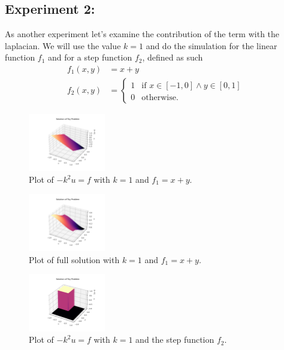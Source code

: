 \documentclass[acmtog]{acmart}
\begin{document}
\subsection{Experiment 2:}
As another experiment let's examine the contribution of the term with the
laplacian. We will use the value $k = 1$ and do the simulation for the linear
function $f_1$ and for a step function $f_2$, defined as such
%
\begin{align}
  f_1(x,y) & = x + y                                           \\
  f_2(x,y) & = \begin{cases}
                 1 & \text{if } x \in [-1, 0] \land y \in [0, 1] \\
                 0 & \text{otherwise}.
               \end{cases}
\end{align}
%
\begin{figure}[H]
  \centering
  \includegraphics[width=0.3\textwidth]{Images/exp1_plane_k.png}
  \caption{Plot of $-k^2 u = f$ with $k=1$ and $f_1 = x+y$.~\label{fig:exp1_plane_k}}
\end{figure}
\begin{figure}[H]
  \centering
  \includegraphics[width=0.3\textwidth]{Images/exp1_plane_full.png}
  \caption{Plot of full solution with $k=1$ and $f_1 = x+y$.~\label{fig:exp1_plane_full}}
\end{figure}
\begin{figure}[H]
  \centering
  \includegraphics[width=0.3\textwidth]{Images/exp1_step_k.png}
  \caption{Plot of $-k^2 u = f$ with $k=1$ and the step function $f_2$.~\label{fig:exp1_step_k}}
\end{figure}
\end{document}
